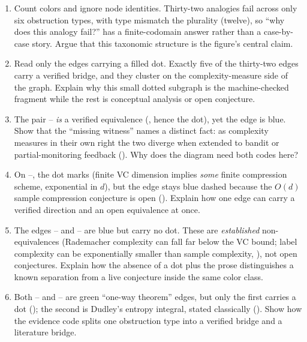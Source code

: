 \begin{enumerate}[leftmargin=*,itemsep=3pt]
\item Count colors and ignore node identities. Thirty-two analogies fail across
only six obstruction types, with type mismatch the plurality (twelve), so ``why
does this analogy fail?'' has a finite-codomain answer rather than a
case-by-case story. Argue that this taxonomic structure is the figure's central
claim.

\item Read only the edges carrying a filled dot. Exactly five of the
thirty-two edges carry a verified bridge, and they cluster on the
complexity-measure side of the graph. Explain why this small dotted subgraph is
the machine-checked fragment while the rest is conceptual analysis or open
conjecture.

\item The pair -- \emph{is} a
verified equivalence (, hence the dot),
yet the edge is blue. Show that the ``missing witness'' names a distinct fact:
as complexity measures in their own right the two diverge when extended to
bandit or partial-monitoring feedback (). Why does the
diagram need both codes here?

\item On --, the dot marks
 (finite VC dimension implies \emph{some}
finite compression scheme, exponential in $d$), but the edge stays blue dashed
because the $O(d)$ sample compression conjecture is open
(). Explain how one edge can carry a verified
direction and an open equivalence at once.

\item The edges -- and
-- are blue but carry no dot.
These are \emph{established} non-equivalences (Rademacher complexity can fall
far below the VC bound; label complexity can be exponentially smaller than
sample complexity, ), not open conjectures. Explain how
the absence of a dot plus the prose distinguishes a known separation from a
live conjecture inside the same color class.

\item Both -- and
-- are green ``one-way
theorem'' edges, but only the first carries a dot
(); the second is Dudley's entropy integral,
stated classically (). Show how the evidence code splits one
obstruction type into a verified bridge and a literature bridge.


\end{enumerate}
